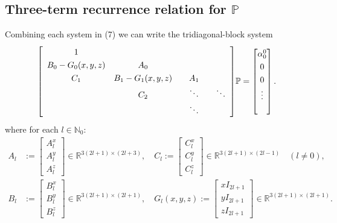 \documentclass[11pt, oneside]{article}   	%
\newcommand{\R}{\mathbb{R}}
\newcommand{\No}{\mathbb{N}_0}
\newcommand{\bigP}{\mathbb{P}}
\begin{document}
\subsection{Three-term recurrence relation for \(\bigP\)}

Combining each system in (7) we can write the tridiagonal-block system
\begin{align}
\renewcommand\arraystretch{1.3}
\mleft[
\begin{array}{cccc}
		1  & & & \\
		B_0-G_0(x,y,z) & A_0 & & \\
		C_1 & B_1-G_1(x,y,z) & \quad A_1 \quad & \\
		& C_2 & \ddots & \ddots \\
		& & \ddots &
\end{array}
\mright]
\bigP
=
\begin{bmatrix}
	\alpha^0_0 \\ 0 \\ 0 \\ \vdots \\ \\
\end{bmatrix}.
\end{align}
where for each \(l \in \No\):
\begin{align}
A_l &:= \begin{bmatrix}
		A^x_l \\
		A^y_l \\
		A^z_l
	    \end{bmatrix} \in \R^{3(2l+1)\times(2l+3)}, \quad
C_l := \begin{bmatrix}
		C^x_l \\
		C^y_l \\
		C^z_l
	    \end{bmatrix} \in \R^{3(2l+1)\times(2l-1)} \quad (l \ne 0), \\
B_l &:= \begin{bmatrix}
		B^x_l \\
		B^y_l \\
		B^z_l
	    \end{bmatrix} \in \R^{3(2l+1)\times(2l+1)}, \quad
G_l(x,y,z) := \begin{bmatrix}
		xI_{2l+1} \\
		yI_{2l+1} \\
		zI_{2l+1}
	    \end{bmatrix} \in \R^{3(2l+1)\times(2l+1)}.
\end{align}
\end{document}
